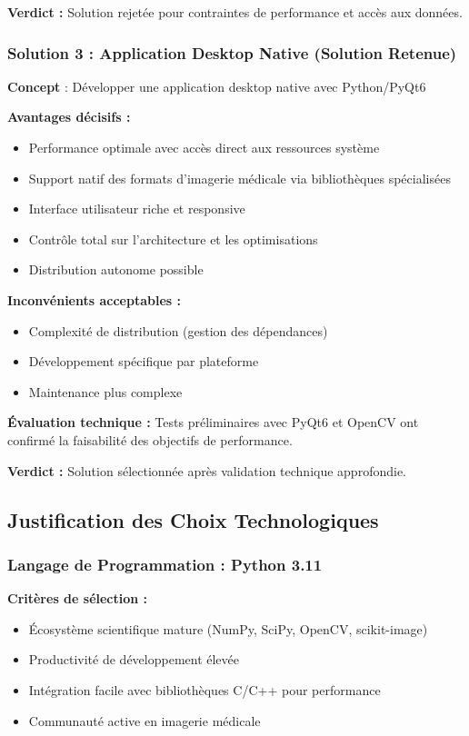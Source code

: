 \documentclass[12pt,a4paper]{report}
\begin{document}
\textbf{Verdict :} Solution rejetée pour contraintes de performance et accès aux données.

\subsubsection{Solution 3 : Application Desktop Native (Solution Retenue)}

\textbf{Concept} : Développer une application desktop native avec Python/PyQt6

\textbf{Avantages décisifs :}
\begin{itemize}
\item Performance optimale avec accès direct aux ressources système
\item Support natif des formats d'imagerie médicale via bibliothèques spécialisées
\item Interface utilisateur riche et responsive
\item Contrôle total sur l'architecture et les optimisations
\item Distribution autonome possible
\end{itemize}

\textbf{Inconvénients acceptables :}
\begin{itemize}
\item Complexité de distribution (gestion des dépendances)
\item Développement spécifique par plateforme
\item Maintenance plus complexe
\end{itemize}

\textbf{Évaluation technique :} Tests préliminaires avec PyQt6 et OpenCV ont confirmé la faisabilité des objectifs de performance.

\textbf{Verdict :} Solution sélectionnée après validation technique approfondie.

\subsection{Justification des Choix Technologiques}

\subsubsection{Langage de Programmation : Python 3.11}

\textbf{Critères de sélection :}
\begin{itemize}
\item Écosystème scientifique mature (NumPy, SciPy, OpenCV, scikit-image)
\item Productivité de développement élevée
\item Intégration facile avec bibliothèques C/C++ pour performance
\item Communauté active en imagerie médicale
\end{itemize}
\end{document}

